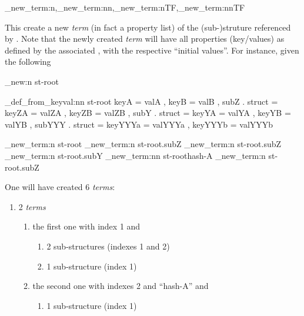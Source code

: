 \documentclass[10pt]{article}
\begin{document}
\begin{codedescribe}{\starray_new_term:n,\starray_new_term:nn,\starray_new_term:nTF,\starray_new_term:nnTF}
\begin{codesyntax}%
\end{codesyntax}
This create a new \textsl{term} (in fact a property list) of the (sub-)struture referenced by . Note that the newly created \textsl{term} will have all properties (key/values) as defined by the associated , with the respective ``initial values''. For instance, given the following 
\end{codedescribe}

\begin{codestore}[store-env=keyval.demo2]
\starray_new:n {st-root}

\starray_def_from_keyval:nn {st-root} 
  {
    keyA = valA ,
    keyB = valB ,
    subZ . struct = 
      {
        keyZA = valZA ,
        keyZB = valZB ,
      }
    subY . struct =
      {
        keyYA = valYA ,
        keyYB = valYB ,
        subYYY . struct =
          {
            keyYYYa = valYYYa ,
            keyYYYb = valYYYb 
          }
      }
  }
  
\starray_new_term:n {st-root}
\starray_new_term:n {st-root.subZ}
\starray_new_term:n {st-root.subZ}
\starray_new_term:n {st-root.subY}
\starray_new_term:nn {st-root}{hash-A}
\starray_new_term:n {st-root.subZ}
\end{codestore}


One will have created 6 \textsl{terms}:
\begin{enumerate}[miditemsep]
\item 2  \textsl{terms}
  \begin{enumerate}[miditemsep]
  \item the first one with index 1 and
  \begin{enumerate}[miditemsep]
    \item 2 sub-structures  (indexes 1 and 2)
    \item 1 sub-structure  (index 1)
  \end{enumerate}
  \item the second one with indexes 2 and ``hash-A'' and
  \begin{enumerate}[miditemsep]
    \item 1 sub-structure  (index 1)
  \end{enumerate}
  \end{enumerate}
\end{enumerate}
\end{document}
